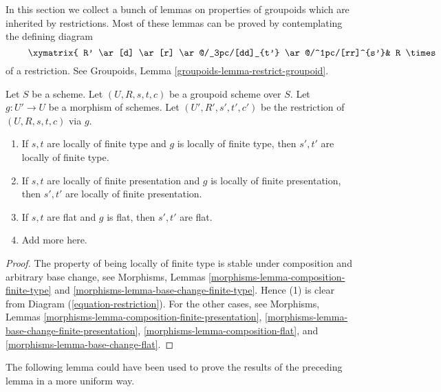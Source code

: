 \noindent
In this section we collect a bunch of lemmas on
properties of groupoids which are inherited by restrictions.
Most of these lemmas can be proved by contemplating the
defining diagram
\begin{equation}
\label{equation-restriction}
\vcenter{
\xymatrix{
R' \ar[d] \ar[r] \ar@/_3pc/[dd]_{t'} \ar@/^1pc/[rr]^{s'}&
R \times_{s, U} U' \ar[r] \ar[d] &
U' \ar[d]^g \\
U' \times_{U, t} R \ar[d] \ar[r] &
R \ar[r]^s \ar[d]_t &
U \\
U' \ar[r]^g &
U
}
}
\end{equation}
of a restriction. See
Groupoids, Lemma \ref{groupoids-lemma-restrict-groupoid}.

\begin{lemma}
\label{lemma-restrict-preserves-type}
Let $S$ be a scheme.
Let $(U, R, s, t, c)$ be a groupoid scheme over $S$.
Let $g : U' \to U$ be a morphism of schemes.
Let $(U', R', s', t', c')$ be the restriction of
$(U, R, s, t, c)$ via $g$.
\begin{enumerate}
\item If $s, t$ are locally of finite type and $g$ is locally of finite
type, then $s', t'$ are locally of finite type.
\item If $s, t$ are locally of finite presentation and $g$ is locally of finite
presentation, then $s', t'$ are locally of finite presentation.
\item If $s, t$ are flat and $g$ is flat, then $s', t'$ are flat.
\item Add more here.
\end{enumerate}
\end{lemma}

\begin{proof}
The property of being locally of finite type is stable under composition
and arbitrary base change, see
Morphisms, Lemmas \ref{morphisms-lemma-composition-finite-type} and
\ref{morphisms-lemma-base-change-finite-type}.
Hence (1) is clear from Diagram (\ref{equation-restriction}).
For the other cases, see
Morphisms, Lemmas \ref{morphisms-lemma-composition-finite-presentation},
\ref{morphisms-lemma-base-change-finite-presentation},
\ref{morphisms-lemma-composition-flat}, and
\ref{morphisms-lemma-base-change-flat}.
\end{proof}

\noindent
The following lemma could have been used to prove the results of the preceding
lemma in a more uniform way.

